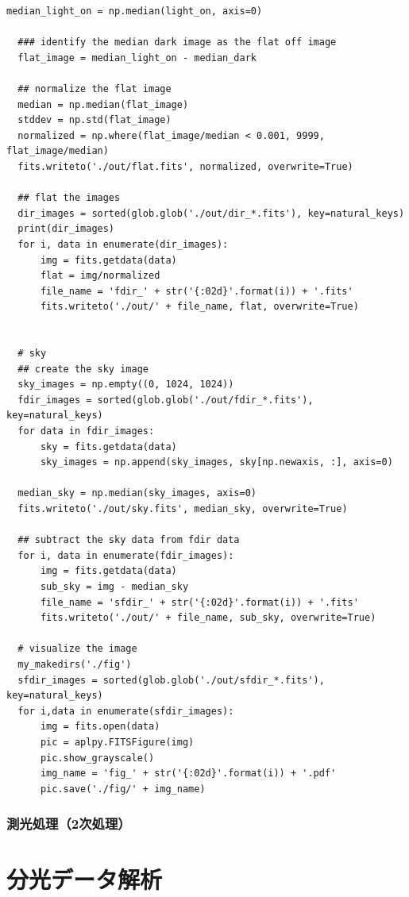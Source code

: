 \begin{lstlisting}[caption=1次処理のまとめ,label=code:itizisyori]
  median_light_on = np.median(light_on, axis=0)

  ### identify the median dark image as the flat off image
  flat_image = median_light_on - median_dark

  ## normalize the flat image
  median = np.median(flat_image)
  stddev = np.std(flat_image)
  normalized = np.where(flat_image/median < 0.001, 9999, flat_image/median)
  fits.writeto('./out/flat.fits', normalized, overwrite=True)

  ## flat the images
  dir_images = sorted(glob.glob('./out/dir_*.fits'), key=natural_keys)
  print(dir_images)
  for i, data in enumerate(dir_images):
      img = fits.getdata(data)
      flat = img/normalized
      file_name = 'fdir_' + str('{:02d}'.format(i)) + '.fits'
      fits.writeto('./out/' + file_name, flat, overwrite=True)


  # sky
  ## create the sky image
  sky_images = np.empty((0, 1024, 1024))
  fdir_images = sorted(glob.glob('./out/fdir_*.fits'), key=natural_keys)
  for data in fdir_images:
      sky = fits.getdata(data)
      sky_images = np.append(sky_images, sky[np.newaxis, :], axis=0)

  median_sky = np.median(sky_images, axis=0)
  fits.writeto('./out/sky.fits', median_sky, overwrite=True)

  ## subtract the sky data from fdir data
  for i, data in enumerate(fdir_images):
      img = fits.getdata(data)
      sub_sky = img - median_sky
      file_name = 'sfdir_' + str('{:02d}'.format(i)) + '.fits'
      fits.writeto('./out/' + file_name, sub_sky, overwrite=True)

  # visualize the image
  my_makedirs('./fig')
  sfdir_images = sorted(glob.glob('./out/sfdir_*.fits'), key=natural_keys)
  for i,data in enumerate(sfdir_images):
      img = fits.open(data)
      pic = aplpy.FITSFigure(img)
      pic.show_grayscale()
      img_name = 'fig_' + str('{:02d}'.format(i)) + '.pdf'
      pic.save('./fig/' + img_name)
\end{lstlisting}

\subsubsection{測光処理（2次処理）}

\section{分光データ解析} %
\label{sect:spec_ana}